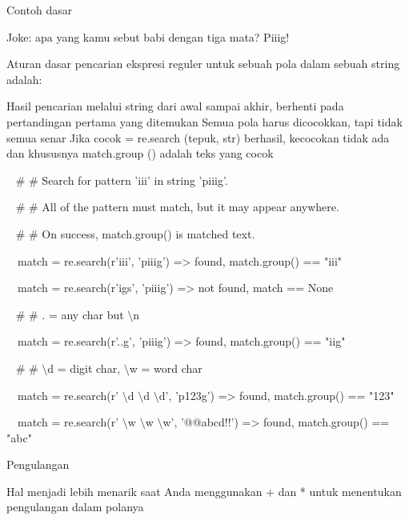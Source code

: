\begin {enumerate}
\begin {enumerate}
\noindent
Contoh dasar \par
\noindent
Joke: apa yang kamu sebut babi dengan tiga mata? Piiig! \par
\vspace{12pt}
\noindent
Aturan dasar pencarian ekspresi reguler untuk sebuah pola dalam sebuah string adalah: \par
\noindent
Hasil pencarian melalui string dari awal sampai akhir, berhenti pada pertandingan pertama yang ditemukan  Semua pola harus dicocokkan, tapi tidak semua senar Jika cocok = re.search (tepuk, str) berhasil, kecocokan tidak ada dan khususnya match.group () adalah teks yang cocok \par
\vspace{12pt}
\noindent
~  $  \#  $ $  \#  $ Search for pattern 'iii' in string 'piiig'. \par
\noindent
~  $  \#  $ $  \#  $ All of the pattern must match, but it may appear anywhere. \par
\noindent
~  $  \#  $ $  \#  $ On success, match.group() is matched text. \par
\noindent
~~match = re.search(r'iii', 'piiig') =>  found, match.group() == "iii" \par
\noindent
~~match = re.search(r'igs', 'piiig') =>  not found, match == None \par
\vspace{12pt}
\noindent
~  $  \#  $ $  \#  $ . = any char but  $  \setminus  $n \par
\noindent
~~match = re.search(r'..g', 'piiig') =>  found, match.group() == "iig" \par
\vspace{12pt}
\noindent
~  $  \#  $ $  \#  $  $  \setminus  $d = digit char,  $  \setminus  $w = word char \par
\noindent
~~match = re.search(r' $  \setminus  $d $  \setminus  $d $  \setminus  $d', 'p123g') =>  found, match.group() == "123" \par
\noindent
~~match = re.search(r' $  \setminus  $w $  \setminus  $w $  \setminus  $w', '@@abcd!!') =>  found, match.group() == "abc" \par
\vspace{12pt}
\vspace{12pt}
\noindent
Pengulangan \par
\vspace{12pt}
\noindent
Hal menjadi lebih menarik saat Anda menggunakan + dan * untuk menentukan pengulangan dalam polanya \par
\vspace{12pt}

\end{enumerate}
\end{enumerate}
